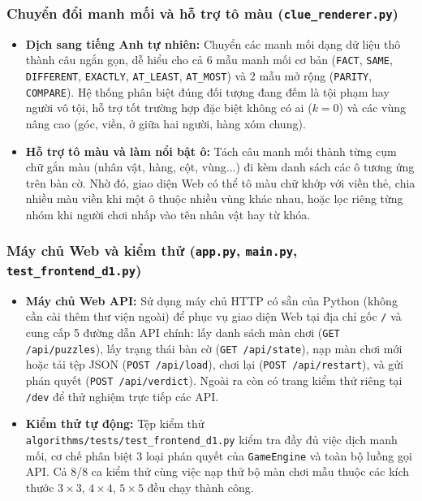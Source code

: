 \subsubsection{Chuyển đổi manh mối và hỗ trợ tô màu (\texttt{clue\_renderer.py})}
\begin{itemize}
    \item \textbf{Dịch sang tiếng Anh tự nhiên:} Chuyển các manh mối dạng dữ liệu thô thành câu ngắn gọn, dễ hiểu cho cả 6 mẫu manh mối cơ bản (\texttt{FACT}, \texttt{SAME}, \texttt{DIFFERENT}, \texttt{EXACTLY}, \texttt{AT\_LEAST}, \texttt{AT\_MOST}) và 2 mẫu mở rộng (\texttt{PARITY}, \texttt{COMPARE}). Hệ thống phân biệt đúng đối tượng đang đếm là tội phạm hay người vô tội, hỗ trợ tốt trường hợp đặc biệt không có ai ($k = 0$) và các vùng nâng cao (góc, viền, ở giữa hai người, hàng xóm chung).
    \item \textbf{Hỗ trợ tô màu và làm nổi bật ô:} Tách câu manh mối thành từng cụm chữ gắn màu (nhân vật, hàng, cột, vùng...) đi kèm danh sách các ô tương ứng trên bàn cờ. Nhờ đó, giao diện Web có thể tô màu chữ khớp với viền thẻ, chia nhiều màu viền khi một ô thuộc nhiều vùng khác nhau, hoặc lọc riêng từng nhóm khi người chơi nhấp vào tên nhân vật hay từ khóa.
\end{itemize}

\subsubsection{Máy chủ Web và kiểm thử (\texttt{app.py}, \texttt{main.py}, \texttt{test\_frontend\_d1.py})}
\begin{itemize}
    \item \textbf{Máy chủ Web API:} Sử dụng máy chủ HTTP có sẵn của Python (không cần cài thêm thư viện ngoài) để phục vụ giao diện Web tại địa chỉ gốc \texttt{/} và cung cấp 5 đường dẫn API chính: lấy danh sách màn chơi (\texttt{GET /api/puzzles}), lấy trạng thái bàn cờ (\texttt{GET /api/state}), nạp màn chơi mới hoặc tải tệp JSON (\texttt{POST /api/load}), chơi lại (\texttt{POST /api/restart}), và gửi phán quyết (\texttt{POST /api/verdict}). Ngoài ra còn có trang kiểm thử riêng tại \texttt{/dev} để thử nghiệm trực tiếp các API.
    \item \textbf{Kiểm thử tự động:} Tệp kiểm thử \texttt{algorithms/tests/test\_frontend\_d1.py} kiểm tra đầy đủ việc dịch manh mối, cơ chế phân biệt 3 loại phán quyết của \texttt{GameEngine} và toàn bộ luồng gọi API. Cả 8/8 ca kiểm thử cùng việc nạp thử bộ màn chơi mẫu thuộc các kích thước $3\times 3$, $4\times 4$, $5\times 5$ đều chạy thành công.
\end{itemize}
